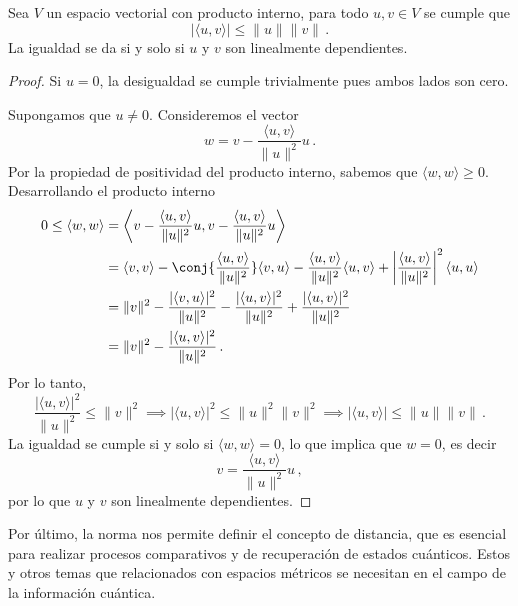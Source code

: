 \begin{theo}
  \label{th:cauchy_schwarz}
  Sea $V$ un espacio vectorial con producto interno, para todo $u, v \in V$ se cumple que
  \[
    |\langle u, v \rangle| \leq \|u\| \|v\|\,.
  \]
  La igualdad se da si y solo si $u$ y $v$ son linealmente dependientes.
\end{theo}

\begin{proof}
  Si $u=0$, la desigualdad se cumple trivialmente pues ambos lados son cero.

  Supongamos que $u \neq 0$. Consideremos el vector
  \[
    w = v - \frac{\langle u, v \rangle}{\|u\|^2} u\,.
  \]
  Por la propiedad de positividad del producto interno, sabemos que $\langle w, w \rangle \geq 0$. Desarrollando el producto interno
  \begin{align*}
    0 \leq \langle w, w \rangle & = \left\langle v - \frac{\langle u, v \rangle}{\|u\|^2} u, v - \frac{\langle u, v \rangle}{\|u\|^2} u \right\rangle                                                                                                              \\
                                & = \langle v, v \rangle - \conj{\frac{\langle u, v \rangle}{\|u\|^2}} \langle v, u \rangle - \frac{\langle u, v \rangle}{\|u\|^2} \langle u, v \rangle + \left|\frac{\langle u, v \rangle}{\|u\|^2}\right|^2 \langle u, u \rangle \\
                                & = \|v\|^2 - \frac{|\langle v, u \rangle|^2}{\|u\|^2} - \frac{|\langle u, v \rangle|^2}{\|u\|^2} + \frac{|\langle u, v \rangle|^2}{\|u\|^2}                                                                                       \\
                                & = \|v\|^2 - \frac{|\langle u, v \rangle|^2}{\|u\|^2}\,.
  \end{align*}
  Por lo tanto,
  \[
    \frac{|\langle u, v \rangle|^2}{\|u\|^2} \leq \|v\|^2 \implies |\langle u, v \rangle|^2 \leq \|u\|^2 \|v\|^2 \implies |\langle u, v \rangle| \leq \|u\| \|v\|\,.
  \]
  La igualdad se cumple si y solo si $\langle w, w \rangle = 0$, lo que implica que $w = 0$, es decir
  \[
    v = \frac{\langle u, v \rangle}{\|u\|^2} u\,,
  \]
  por lo que $u$ y $v$ son linealmente dependientes.
\end{proof}

Por último, la norma nos permite definir el concepto de distancia, que es esencial para realizar procesos comparativos y de recuperación de estados cuánticos. Estos y otros temas que relacionados con espacios métricos se necesitan en el campo de la información cuántica.

